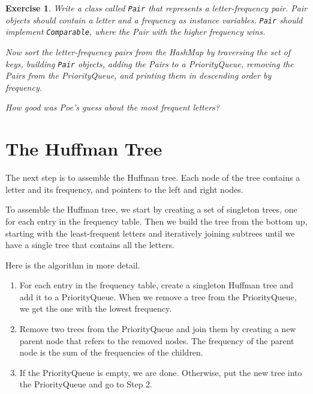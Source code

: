 \documentclass[12pt]{book}
\theoremstyle{exercise}
\newtheorem{exercise}{Exercise}[chapter]
\begin{document}
\begin{exercise}
\label{ex.pair}
Write a class called {\tt Pair} that represents a letter-frequency
pair.  Pair objects should contain a letter and a frequency as
instance variables.  {\tt Pair} should implement {\tt Comparable},
where the Pair with the higher frequency wins.


Now sort the letter-frequency pairs from the HashMap by traversing the
set of keys, building {\tt Pair} objects, adding the Pairs to a
PriorityQueue, removing the Pairs from the PriorityQueue, and printing
them in descending order by frequency.

How good was Poe's guess about the most frequent letters?
\end{exercise}


\section{The Huffman Tree}
\label{hufftree}

The next step is to assemble the Huffman tree.  Each node
of the tree contains a letter and its frequency, and pointers to
the left and right nodes.

To assemble the Huffman tree, we start by creating a set of
singleton trees, one for each entry in the frequency table.
Then we build the tree from the bottom up, starting with the
least-frequent letters and iteratively joining subtrees until
we have a single tree that contains all the letters.

Here is the algorithm in more detail.

\begin{enumerate}

\item For each entry in the frequency table, create a singleton
Huffman tree and add it to a PriorityQueue.  When we remove a tree from
the PriorityQueue, we get the one with the lowest frequency.

\item Remove two trees from the PriorityQueue and join them by creating
a new parent node that refers to the removed nodes.  The frequency
of the parent node is the sum of the frequencies of the children.

\item If the PriorityQueue is empty, we are done.  Otherwise, put the
new tree into the PriorityQueue and go to Step 2.

\end{enumerate}
\end{document}
